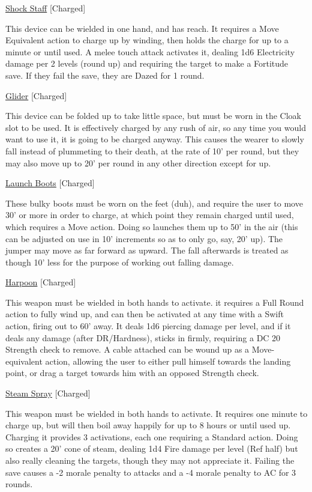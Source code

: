 \medskip\noindent\underline{Shock Staff} [Charged]

\noindent This device can be wielded in one hand, and has reach. It requires a Move Equivalent action to charge up by winding, then holds the charge for up to a minute or until used. A melee touch attack activates it, dealing 1d6 Electricity damage per 2 levels (round up) and requiring the target to make a Fortitude save. If they fail the save, they are Dazed for 1 round.

\medskip\noindent\underline{Glider} [Charged]

\noindent This device can be folded up to take little space, but must be worn in the Cloak slot to be used. It is effectively charged by any rush of air, so any time you would want to use it, it is going to be charged anyway. This causes the wearer to slowly fall instead of plummeting to their death, at the rate of 10' per round, but they may also move up to 20' per round in any other direction except for up.

\medskip\noindent\underline{Launch Boots} [Charged]

\noindent These bulky boots must be worn on the feet (duh), and require the user to move 30' or more in order to charge, at which point they remain charged until used, which requires a Move action. Doing so launches them up to 50' in the air (this can be adjusted on use in 10' increments so as to only go, say, 20' up). The jumper may move as far forward as upward. The fall afterwards is treated as though 10' less for the purpose of working out falling damage.

\medskip\noindent\underline{Harpoon} [Charged]

\noindent This weapon must be wielded in both hands to activate. it requires a Full Round action to fully wind up, and can then be activated at any time with a Swift action, firing out to 60' away. It deals 1d6 piercing damage per level, and if it deals any damage (after DR/Hardness), sticks in firmly, requiring a DC 20 Strength check to remove. A cable attached can be wound up as a Move-equivalent action, allowing the user to either pull himself towards the landing point, or drag a target towards him with an opposed Strength check.

\medskip\noindent\underline{Steam Spray} [Charged]

\noindent This weapon must be wielded in both hands to activate. It requires one minute to charge up, but will then boil away happily for up to 8 hours or until used up. Charging it provides 3 activations, each one requiring a Standard action. Doing so creates a 20' cone of steam, dealing 1d4 Fire damage per level (Ref half) but also really cleaning the targets, though they may not appreciate it. Failing the save causes a -2 morale penalty to attacks and a -4 morale penalty to AC for 3 rounds.

